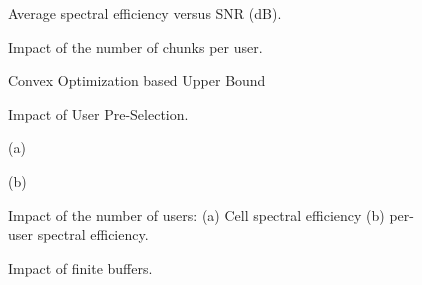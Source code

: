 \documentclass[11pt] {article}
\begin{document}
\begin{table}
\begin{footnotesize}
\begin{center}
\end{center}
\end{footnotesize}
\end{table}







\begin{figure}[htb!]
\begin{center}
\centerline{}
\caption{Average spectral efficiency versus SNR (dB).}
\label{fig_plot2}
\end{center}
\end{figure}



\begin{figure}[htb!]
\begin{center}
\centerline{}
\caption{Impact of the number of chunks per user.}
\label{fig_plot4}
\end{center}
\end{figure}

\begin{figure}[htb!]
\begin{center}
\centerline{}
\caption{Convex Optimization based Upper Bound}
\label{fig_newUB}
\end{center}
\end{figure}


\begin{figure}[htb!]
\begin{center}
\centerline{}
\caption{Impact of User Pre-Selection.}
\label{fig_plot3}
\end{center}
\end{figure}


\begin{figure}[htb!]
\begin{center}
\centerline{}
\centerline{\small (a)}
\centerline{}
\centerline{\small (b)}
\caption{Impact of the number of users: (a) Cell spectral efficiency (b) per-user spectral efficiency.}
\label{fig_plotincu}
\end{center}
\end{figure}



\begin{figure}[htb!]
\begin{center}
\centerline{}
\caption{Impact of finite buffers.}
\label{fig_plotfb}
\end{center}
\end{figure}
\end{document}
